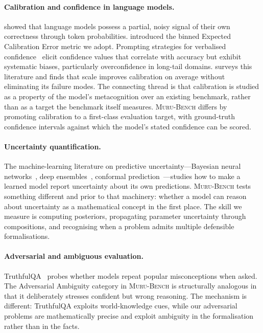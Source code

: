 \documentclass{article}
\newcommand{\muru}{\textsc{Muru-Bench}}
\begin{document}
\paragraph{Calibration and confidence in language models.}
\citet{kadavath2022} showed that language models possess a partial, noisy signal of their own correctness through token probabilities. \citet{guo2017} introduced the binned Expected Calibration Error metric we adopt. Prompting strategies for verbalised confidence~\citep{tian2023} elicit confidence values that correlate with accuracy but exhibit systematic biases, particularly overconfidence in long-tail domains. \citet{xiong2024} surveys this literature and finds that scale improves calibration on average without eliminating its failure modes. The connecting thread is that calibration is studied as a property of the model's metacognition over an existing benchmark, rather than as a target the benchmark itself measures. \muru{} differs by promoting calibration to a first-class evaluation target, with ground-truth confidence intervals against which the model's stated confidence can be scored.

\paragraph{Uncertainty quantification.}
The machine-learning literature on predictive uncertainty---Bayesian neural networks~\citep{gal2016}, deep ensembles~\citep{lakshminarayanan2017}, conformal prediction~\citep{angelopoulos2022}---studies how to make a learned model report uncertainty about its own predictions. \muru{} tests something different and prior to that machinery: whether a model can reason about uncertainty as a mathematical concept in the first place. The skill we measure is computing posteriors, propagating parameter uncertainty through compositions, and recognising when a problem admits multiple defensible formalisations.

\paragraph{Adversarial and ambiguous evaluation.}
TruthfulQA~\citep{lin2022} probes whether models repeat popular misconceptions when asked. The Adversarial Ambiguity category in \muru{} is structurally analogous in that it deliberately stresses confident but wrong reasoning. The mechanism is different: TruthfulQA exploits world-knowledge cues, while our adversarial problems are mathematically precise and exploit ambiguity in the formalisation rather than in the facts.
\end{document}
